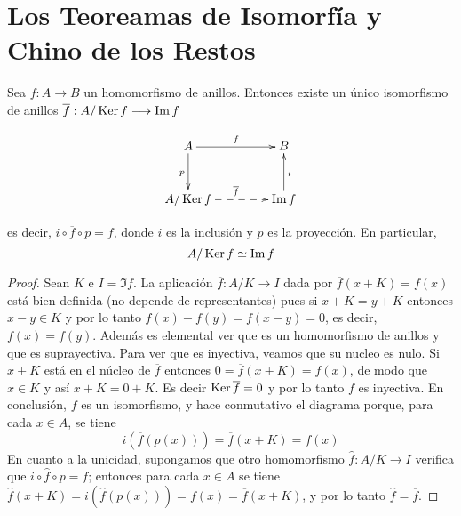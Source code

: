 \section{ Los Teoreamas de Isomorfía y Chino de los Restos}

\begin{teo}
    Sea $f:A\longrightarrow B$ un homomorfismo de anillos. Entonces existe un único isomorfismo de anillos $\overline{f}: A/\operatorname{\rm Ker} f\longrightarrow \operatorname{\rm Im} f$

    $$\xymatrix@C=1.5cm@R=1cm{ 
        A \ar[r]^f\ar[d]_p                     & B \\ 
        A/\Ker f \ar@{-->}[r]^{\overline{f}}  & \Im f\ar[u]_i 
    }$$
    
    es decir, $i\circ \overline{f} \circ p=f$, donde $i$ es la inclusión y $p$ es la proyección. En particular,
    $$ A/\operatorname{\rm Ker} f\simeq \operatorname{\rm Im} f$$
\end{teo}

\begin{proof}
    Sean $K$ e $I=\Im f$. La aplicación $\overline{f}: A/K\longrightarrow I$ dada por $\overline{f}(x+K)=f(x)$ está bien definida (no depende de representantes) pues si $x+K=y+K$ entonces $x-y\in K$ y por lo tanto $f(x)-f(y)=f(x-y)=0$, es decir, $f(x)=f(y)$. Además es elemental ver que es un homomorfismo de anillos y que es suprayectiva. Para ver que es inyectiva, veamos que su nucleo es nulo. Si $x+K$ está en el núcleo de $\overline{f}$ entonces $0=\overline{f}(x+K)=f(x)$, de modo que $x\in K$ y así $x+K=0+K$. Es decir $\operatorname{\rm Ker}\overline{f}=0$ y por lo tanto $f$ es inyectiva. En conclusión, $\overline{f}$ es un isomorfismo, y hace conmutativo el diagrama porque, para cada $x\in A$, se tiene
    $$i\left(\overline{f}\left(p(x)\right)\right)=\overline{f}(x+K)=f(x)$$
    En cuanto a la unicidad, supongamos que otro homomorfismo $\widehat{f}:A/K\longrightarrow I$ verifica que $i\circ \widehat{f} \circ p=f$; entonces para cada $x\in A$ se tiene $\widehat{f}(x+K)=i(\widehat{f}(p(x)))=f(x)=\overline{f}(x+K)$, y por lo tanto $\widehat{f}=\overline{f}$.
\end{proof}
